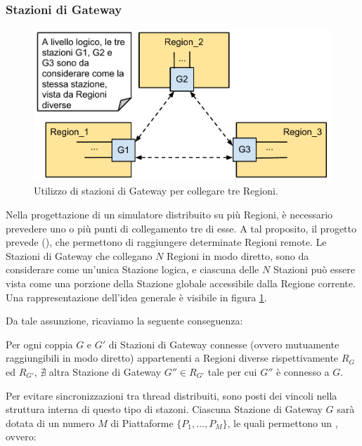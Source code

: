 	
	\subsubsection{Stazioni di Gateway}\label{sec:gateway_stations}
	
	\begin{figure}[htbp]
		\begin{center}
			\includegraphics[width=\textwidth,keepaspectratio]{imgs/gateway_stations.pdf}
			\caption{\footnotesize{Utilizzo di stazioni di Gateway per collegare tre Regioni.}}
			\label{fig:gateway_stations}
		\end{center}
	\end{figure}

	Nella progettazione di un simulatore distribuito su più Regioni, è necessario prevedere uno o più punti di collegamento tre di esse. A tal proposito, il progetto prevede  (), che permettono di raggiungere determinate Regioni remote. Le Stazioni di Gateway che collegano $N$ Regioni in modo diretto, sono da considerare come un'unica Stazione logica, e ciascuna delle $N$ Stazioni può essere vista come una porzione della Stazione globale accessibile dalla Regione corrente. Una rappresentazione dell'idea generale è visibile in figura \ref{fig:gateway_stations}.
	
	Da tale assunzione, ricaviamo la seguente conseguenza:
	\begin{consequence}\label{cons:gateway_unique}
	Per ogni coppia $G$ e $G'$ di Stazioni di Gateway connesse (ovvero mutuamente raggiungibili in modo diretto) appartenenti a Regioni diverse rispettivamente $R_G$ ed $R_{G'}$, $\nexists$ altra Stazione di Gateway $G'' \in R_{G'}$ tale per cui $G''$ è connesso a $G$.
	\end{consequence}

	Per evitare sincronizzazioni tra thread distribuiti, sono posti dei vincoli nella struttura interna di questo tipo di stazoni. Ciascuna Stazione di Gateway $G$ sarà dotata di un numero $M$ di Piattaforme $\{P_1,...,P_M\}$, le quali permettono un , ovvero:
		
